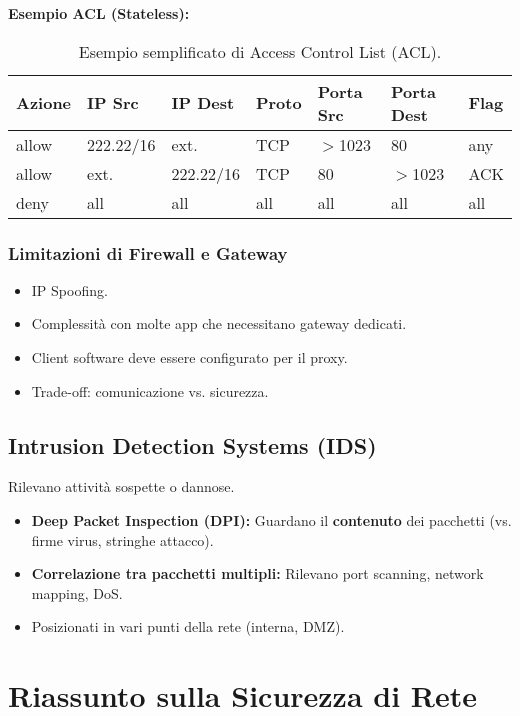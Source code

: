 \textbf{Esempio ACL (Stateless):}
\begin{table}[H]
    \centering
    \begin{tabular}{|l|l|l|l|l|l|l|}
        \hline
        \textbf{Azione} & \textbf{IP Src} & \textbf{IP Dest} & \textbf{Proto} & \textbf{Porta Src} & \textbf{Porta Dest} & \textbf{Flag} \\ \hline
        allow & 222.22/16 & ext. & TCP & $>$1023 & 80 & any \\ \hline
        allow & ext. & 222.22/16 & TCP & 80 & $>$1023 & ACK \\ \hline
        deny  & all & all & all & all & all & all \\ \hline
    \end{tabular}
    \caption{Esempio semplificato di Access Control List (ACL).}
\end{table}


\subsubsection{Limitazioni di Firewall e Gateway}
\begin{itemize}
    \item IP Spoofing.
    \item Complessità con molte app che necessitano gateway dedicati.
    \item Client software deve essere configurato per il proxy.
    \item Trade-off: comunicazione vs. sicurezza.
\end{itemize}

\subsection{Intrusion Detection Systems (IDS)}
Rilevano attività sospette o dannose.
\begin{itemize}
    \item \textbf{Deep Packet Inspection (DPI):} Guardano il \textbf{contenuto} dei pacchetti (vs. firme virus, stringhe attacco).
    \item \textbf{Correlazione tra pacchetti multipli:} Rilevano port scanning, network mapping, DoS.
    \item Posizionati in vari punti della rete (interna, DMZ).
\end{itemize}

\section{Riassunto sulla Sicurezza di Rete}
\label{sec:riassunto_sicurezza}

